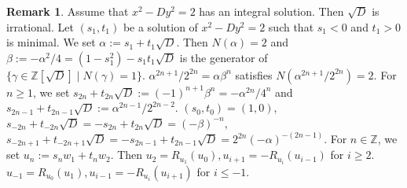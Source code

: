 \documentclass[leqno,11pt]{amsart}
\def\Z{\ensuremath{\mathbb{Z}}}
\theoremstyle{definition}
\newtheorem{Rem}[Thm]{Remark}
\def\Z{\ensuremath{\mathbb{Z}}}
\begin{document}
\begin{Rem}
Assume that $x^2-D y^2=2$ has an integral solution.
Then $\sqrt{D}$ is irrational.
Let $(s_1,t_1)$ be a solution of  $x^2-D y^2=2$
such that $s_1<0$ and $t_1>0$ is minimal.
We set $\alpha:=s_1+t_1 \sqrt{D}$.
Then $N(\alpha)=2$ and $\beta:=-\alpha^2/4=(1-s_1^2)-s_1 t_1 \sqrt{D}$
is the generator of 
$\{ \gamma \in \Z[\sqrt{D}] \mid N(\gamma)=1 \}$.
$\alpha^{2n+1}/2^{2n}=\alpha \beta^n$ satisfies
$N(\alpha^{2n+1}/2^{2n})=2$.
For $n \geq 1$,
we set $s_{2n}+t_{2n} \sqrt{D}:=(-1)^{n+1}\beta^n=-\alpha^{2n}/4^n$
and $s_{2n-1}+t_{2n-1}\sqrt{D}:=\alpha^{2n-1}/2^{2n-2}$.
$(s_0,t_0)=(1,0)$,
$s_{-2n}+t_{-2n} \sqrt{D}=-s_{2n}+t_{2n}\sqrt{D}=(-\beta)^{-n}$,
$s_{-2n+1}+t_{-2n+1} \sqrt{D}=-s_{2n-1}+t_{2n-1}\sqrt{D}
=2^{2n} (-\alpha)^{-(2n-1)}$.
For $n \in \Z$, we set $u_n:=s_n w_1+t_n w_2$.
Then $u_2=R_{u_1}(u_0), u_{i+1}=-R_{u_i}(u_{i-1})$ for $i\geq 2$.
$u_{-1}=R_{u_0}(u_1), u_{i-1}=-R_{u_i}(u_{i+1})$ for $i \leq -1$.
\end{Rem}
\end{document}

